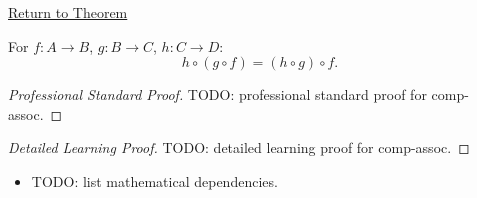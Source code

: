 \newpage
{}
\label{prf:comp-assoc}

\begin{remark*}[Return]
\hyperref[thm:comp-assoc]{Return to Theorem}
\end{remark*}

\begin{theorem*}
For $f : A \to B$, $g : B \to C$, $h : C \to D$:
\[
h \circ (g \circ f) = (h \circ g) \circ f.
\]
\end{theorem*}

\begin{proof}[Professional Standard Proof]
\LRAProofBodyStart
TODO: professional standard proof for comp-assoc.
\end{proof}

\begin{proof}[Detailed Learning Proof]
\LRAProofBodyStart
TODO: detailed learning proof for comp-assoc.
\end{proof}

\begin{remark*}
\end{remark*}

\begin{dependencies}
\begin{itemize}
  \item TODO: list mathematical dependencies.
\end{itemize}
\end{dependencies}

\clearpage
